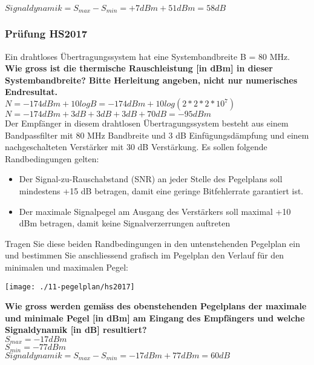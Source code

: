 $Signaldynamik = S_{max}-S_{min}=+7dBm+51dBm=58dB$

\columnbreak

\subsubsection{Prüfung HS2017}
Ein drahtloses Übertragungssystem hat eine Systembandbreite B = 80 MHz.\\

\textbf{Wie gross ist die thermische Rauschleistung [in dBm] in dieser Systembandbreite? Bitte Herleitung angeben, nicht nur numerisches Endresultat.}\\
$N=-174dBm+10logB=-174dBm+10log(2*2*2*10^7)$\\
$N=-174dBm + 3 dB + 3 dB + 3 dB + 70 dB = -95dBm$\\

Der Empfänger in diesem drahtlosen Übertragungssystem besteht aus einem Bandpassfilter mit 80 MHz Bandbreite und 3 dB Einfügungsdämpfung und einem nachgeschalteten
Verstärker mit 30 dB Verstärkung. Es sollen folgende Randbedingungen gelten:\\
\begin{itemize}
    \item Der Signal-zu-Rauschabstand (SNR) an jeder Stelle des Pegelplans soll mindestens +15 dB betragen, damit eine geringe Bitfehlerrate garantiert ist.
    \item Der maximale Signalpegel am Ausgang des Verstärkers soll maximal +10 dBm betragen, damit keine Signalverzerrungen auftreten\\
\end{itemize}

Tragen Sie diese beiden Randbedingungen in den untenstehenden Pegelplan ein und bestimmen Sie anschliessend grafisch im Pegelplan den Verlauf für den minimalen und
maximalen Pegel:
\begin{center}
    \vspace{-8pt}
    \texttt{[image: ./11-pegelplan/hs2017]}
    \vspace{-8pt}
\end{center}

\textbf{Wie gross werden gemäss des obenstehenden Pegelplans der maximale und minimale Pegel [in dBm] am Eingang des Empfängers und welche Signaldynamik [in dB] resultiert?}\\
$S_{max}=-17dBm$\\
$S_{min}=-77dBm$\\

$Signaldynamik = S_{max}-S_{min}=-17dBm+77dBm=60dB$
